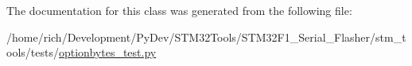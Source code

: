 The documentation for this class was generated from the following file\+:\begin{DoxyCompactItemize}
\item 
/home/rich/\+Development/\+Py\+Dev/\+S\+T\+M32\+Tools/\+S\+T\+M32\+F1\+\_\+\+Serial\+\_\+\+Flasher/stm\+\_\+tools/tests/\hyperlink{optionbytes__test_8py}{optionbytes\+\_\+test.\+py}\end{DoxyCompactItemize}
